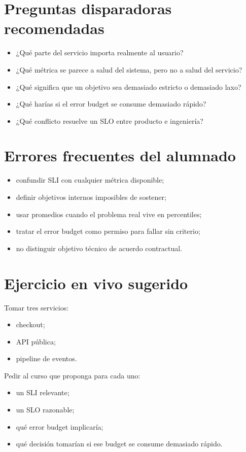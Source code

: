 \documentclass[variant=docente,cover=institutional,mode=screen]{ua-engineering-v6-article}
\begin{document}
\section{Preguntas disparadoras recomendadas}

\begin{itemize}
\item ¿Qué parte del servicio importa realmente al usuario?
\item ¿Qué métrica se parece a salud del sistema, pero no a salud del servicio?
\item ¿Qué significa que un objetivo sea demasiado estricto o demasiado laxo?
\item ¿Qué harías si el error budget se consume demasiado rápido?
\item ¿Qué conflicto resuelve un SLO entre producto e ingeniería?
\end{itemize}

\section{Errores frecuentes del alumnado}

\begin{itemize}
\item confundir SLI con cualquier métrica disponible;
\item definir objetivos internos imposibles de sostener;
\item usar promedios cuando el problema real vive en percentiles;
\item tratar el error budget como permiso para fallar sin criterio;
\item no distinguir objetivo técnico de acuerdo contractual.
\end{itemize}

\section{Ejercicio en vivo sugerido}

Tomar tres servicios:
\begin{itemize}
\item checkout;
\item API pública;
\item pipeline de eventos.
\end{itemize}

Pedir al curso que proponga para cada uno:
\begin{itemize}
\item un SLI relevante;
\item un SLO razonable;
\item qué error budget implicaría;
\item qué decisión tomarían si ese budget se consume demasiado rápido.
\end{itemize}
\end{document}
